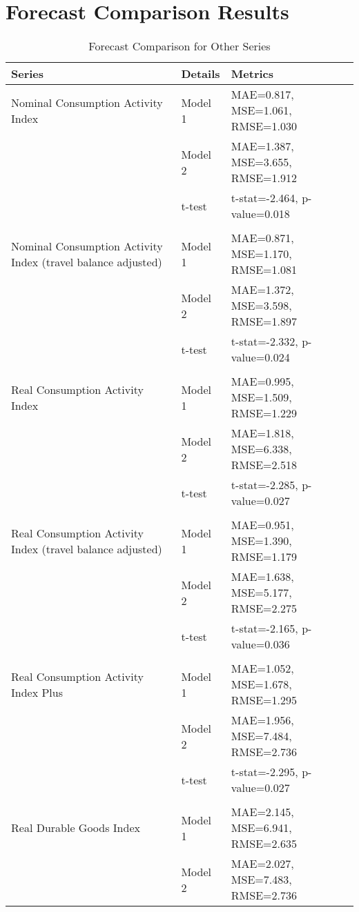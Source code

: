 \documentclass[a4paper,12pt]{article}
\begin{document}
\section*{Forecast Comparison Results}

\begin{table}
\caption{Forecast Comparison for Other Series}
\label{tab:forecast_comparison_other}
\begin{tabular}{llp{10cm}}
\toprule
Series & Details & Metrics \\
\midrule
Nominal Consumption Activity Index & Model 1 & MAE=0.817, MSE=1.061, RMSE=1.030 \\
 & Model 2 & MAE=1.387, MSE=3.655, RMSE=1.912 \\
 & t-test & t-stat=-2.464, p-value=0.018 \\
\arrayrulecolor{black!30}\midrule &  &  \\
Nominal Consumption Activity Index (travel balance adjusted) & Model 1 & MAE=0.871, MSE=1.170, RMSE=1.081 \\
 & Model 2 & MAE=1.372, MSE=3.598, RMSE=1.897 \\
 & t-test & t-stat=-2.332, p-value=0.024 \\
\arrayrulecolor{black!30}\midrule &  &  \\
Real Consumption Activity Index & Model 1 & MAE=0.995, MSE=1.509, RMSE=1.229 \\
 & Model 2 & MAE=1.818, MSE=6.338, RMSE=2.518 \\
 & t-test & t-stat=-2.285, p-value=0.027 \\
\arrayrulecolor{black!30}\midrule &  &  \\
Real Consumption Activity Index (travel balance adjusted) & Model 1 & MAE=0.951, MSE=1.390, RMSE=1.179 \\
 & Model 2 & MAE=1.638, MSE=5.177, RMSE=2.275 \\
 & t-test & t-stat=-2.165, p-value=0.036 \\
\arrayrulecolor{black!30}\midrule &  &  \\
Real Consumption Activity Index Plus & Model 1 & MAE=1.052, MSE=1.678, RMSE=1.295 \\
 & Model 2 & MAE=1.956, MSE=7.484, RMSE=2.736 \\
 & t-test & t-stat=-2.295, p-value=0.027 \\
\arrayrulecolor{black!30}\midrule &  &  \\
Real Durable Goods Index & Model 1 & MAE=2.145, MSE=6.941, RMSE=2.635 \\
 & Model 2 & MAE=2.027, MSE=7.483, RMSE=2.736 \\

\end{tabular}
\end{table}
\end{document}
